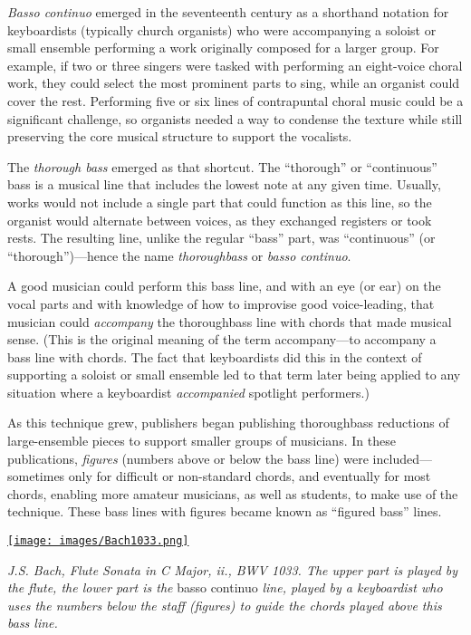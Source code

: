 \documentclass{book}
\begin{document}
\emph{Basso continuo} emerged in the seventeenth century as a shorthand
notation for keyboardists (typically church organists) who were accompanying a
soloist or small ensemble performing a work originally composed for a larger
group. For example, if two or three singers were tasked with performing an
eight-voice choral work, they could select the most prominent parts to sing,
while an organist could cover the rest. Performing five or six lines of
contrapuntal choral music could be a significant challenge, so organists
needed a way to condense the texture while still preserving the core musical
structure to support the vocalists.

The \emph{thorough bass} emerged as that shortcut. The ``thorough'' or
``continuous'' bass is a musical line that includes the lowest note at any
given time. Usually, works would not include a single part that could function
as this line, so the organist would alternate between voices, as they
exchanged registers or took rests. The resulting line, unlike the regular
``bass'' part, was ``continuous'' (or ``thorough'')---hence the name
\emph{thoroughbass} or \emph{basso continuo}.

A good musician could perform this bass line, and with an eye (or ear) on the
vocal parts and with knowledge of how to improvise good voice-leading, that
musician could \emph{accompany} the thoroughbass line with chords that made
musical sense. (This is the original meaning of the term accompany---to
accompany a bass line with chords. The fact that keyboardists did this in the
context of supporting a soloist or small ensemble led to that term later being
applied to any situation where a keyboardist \emph{accompanied} spotlight
performers.)

As this technique grew, publishers began publishing thoroughbass reductions of
large-ensemble pieces to support smaller groups of musicians. In these
publications, \emph{figures} (numbers above or below the bass line) were
included---sometimes only for difficult or non-standard chords, and eventually
for most chords, enabling more amateur musicians, as well as students, to make
use of the technique. These bass lines with figures became known as ``figured
bass'' lines.

\href{images/Bach1033.png}{\texttt{[image: images/Bach1033.png]}}

\emph{J.S. Bach, Flute Sonata in C Major, ii., BWV 1033. The upper part is
played by the flute, the lower part is the} basso continuo \emph{line, played
by a keyboardist who uses the numbers below the staff (figures) to guide the
chords played above this bass line.}
\end{document}
